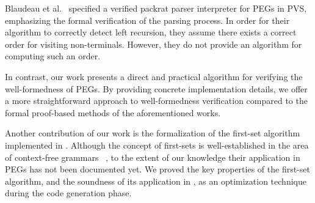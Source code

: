 Blaudeau et al.~\cite{blaudeau_verified_2020} specified
a verified packrat parser interpreter for PEGs in PVS,
emphasizing the formal verification of the parsing process.
In order for their algorithm to correctly detect left recursion,
they assume there exists a correct order for visiting non-terminals.
However, they do not provide an algorithm for computing such an order.

In contrast, our work presents a direct and practical algorithm
for verifying the well-formedness of PEGs.
By providing concrete implementation details,
we offer a more straightforward approach
to well-formedness verification compared
to the formal proof-based methods of the aforementioned works.

Another contribution of our work
is the formalization of the first-set algorithm implemented in \lpeg{}.
Although the concept of first-sets is well-established
in the area of context-free grammars~%
\cite{chomsky_three_1956},
to the extent of our knowledge
their application in PEGs has not been documented yet.
We proved the key properties of the first-set algorithm,
and the soundness of its application in \lpeg{},
as an optimization technique
during the code generation phase.

